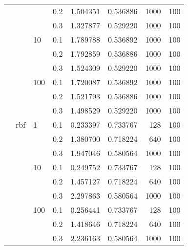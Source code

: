 \begin{table}[H]
\begin{tabular}{llllrrrr}
           &     &     & 0.2 &  1.504351 &  0.536886 &    1000 &   100 \\
           &     &     & 0.3 &  1.327877 &  0.529220 &    1000 &   100 \\
           &     & 10  & 0.1 &  1.789788 &  0.536892 &    1000 &   100 \\
           &     &     & 0.2 &  1.792859 &  0.536886 &    1000 &   100 \\
           &     &     & 0.3 &  1.524309 &  0.529220 &    1000 &   100 \\
           &     & 100 & 0.1 &  1.720087 &  0.536892 &    1000 &   100 \\
           &     &     & 0.2 &  1.521793 &  0.536886 &    1000 &   100 \\
           &     &     & 0.3 &  1.498529 &  0.529220 &    1000 &   100 \\
           & rbf & 1   & 0.1 &  0.233397 &  0.733767 &     128 &   100 \\
           &     &     & 0.2 &  1.380700 &  0.718224 &     640 &   100 \\
           &     &     & 0.3 &  1.947046 &  0.580564 &    1000 &   100 \\
           &     & 10  & 0.1 &  0.249752 &  0.733767 &     128 &   100 \\
           &     &     & 0.2 &  1.457127 &  0.718224 &     640 &   100 \\
           &     &     & 0.3 &  2.297863 &  0.580564 &    1000 &   100 \\
           &     & 100 & 0.1 &  0.256441 &  0.733767 &     128 &   100 \\
           &     &     & 0.2 &  1.418646 &  0.718224 &     640 &   100 \\
           &     &     & 0.3 &  2.236163 &  0.580564 &    1000 &   100 \\
\bottomrule
\end{tabular}
\end{table}
